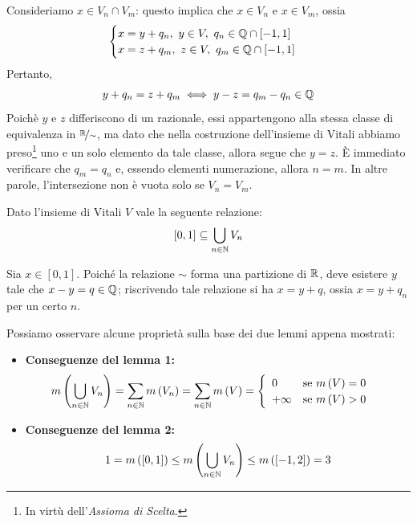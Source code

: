 \begin{demonstration}
	Consideriamo $x\in V_n\cap V_m$: questo implica che $x\in V_n$ e $x\in V_m$, ossia
	\begin{equation*}
		\begin{cases}
			x=y+q_n,\ y\in V,\ q_n\in\mathbb{Q}\cap\left[-1,1\right]\\
			x=z+q_m,\ z\in V,\ q_m\in\mathbb{Q}\cap\left[-1,1\right]
		\end{cases}
	\end{equation*}
	Pertanto,
	\begin{equation*}
		y+q_n=z+q_m\iff y-z=q_m-q_n\in\mathbb{Q}
	\end{equation*}
	Poichè $y$ e $z$ differiscono di un razionale, essi appartengono alla stessa classe di equivalenza in $\nicefrac{\mathbb{R}}{\sim}$, ma dato che nella costruzione dell'insieme di Vitali abbiamo preso\footnote{In virtù dell'\textit{Assioma di Scelta}.} uno e un solo elemento da tale classe, allora segue che $y=z$. È immediato verificare che $q_m=q_n$ e, essendo elementi numerazione, allora $n=m$. In altre parole, l'intersezione non è vuota solo se $V_n=V_m$.
\end{demonstration}
\begin{lemming}
	Dato l'insieme di Vitali $V$ vale la seguente relazione:
	\begin{equation*}
		\left[0,1\right]\subseteq\bigcup_{n\in\mathbb{N}}V_n
	\end{equation*}
\end{lemming}
\begin{demonstration}
	Sia $x\in\left[0,1\right]$. Poiché la relazione $\sim$ forma una partizione di $\mathbb{R}$, deve esistere $y$ tale che $x-y=q\in\mathbb{Q}$; riscrivendo tale relazione si ha $x=y+q$, ossia $x=y+q_n$ per un certo $n$.
\end{demonstration}
Possiamo osservare alcune proprietà sulla base dei due lemmi appena mostrati:
\begin{itemize}
	\item \textbf{Conseguenze del lemma 1:}
	\begin{equation*}
		m\left(\bigcup_{n\in\mathbb{N}}V_n\right)=\sum_{n\in\mathbb{N}}m\left(V_n\right)=\sum_{n\in\mathbb{N}}m\left(V\right)=\begin{cases}
			\begin{array}{ll}
				0&\text{se }m\left(V\right)=0\\
				+\infty&\text{se }m\left(V\right)>0
			\end{array}
		\end{cases}
	\end{equation*}
	\item \textbf{Conseguenze del lemma 2:}
	\begin{equation*}
		1=m\left(\left[0,1\right]\right)\leq m\left(\bigcup_{n\in\mathbb{N}}V_n\right)\leq m\left(\left[-1,2\right]\right)=3
	\end{equation*}
\end{itemize}
